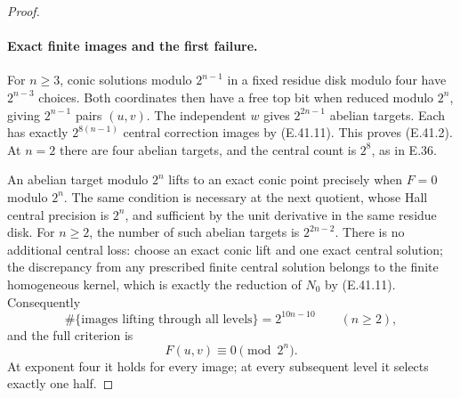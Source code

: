 \begin{proof}
\paragraph{Exact finite images and the first failure.}
For $n\ge3$, conic solutions modulo $2^{n-1}$
in a fixed residue disk modulo four have
$2^{n-3}$ choices.  Both coordinates then
have a free top bit when reduced modulo
$2^n$, giving $2^{n-1}$ pairs $(u,v)$.
The independent $w$ gives $2^{2n-1}$
abelian targets.
Each has exactly $2^{8(n-1)}$ central
correction images by \textup{(E.41.11)}.
This proves \textup{(E.41.2)}.
At $n=2$ there are four abelian targets,
and the central count is $2^8$, as in E.36.

An abelian target modulo $2^n$ lifts to an
exact conic point precisely when
$F=0$ modulo $2^n$.
The same condition is necessary at the
next quotient, whose Hall central precision
is $2^n$, and sufficient by the unit
derivative in the same residue disk.
For $n\ge2$, the number of such abelian
targets is $2^{2n-2}$.
There is no additional central loss:
choose an exact conic lift and one exact
central solution; the discrepancy from
any prescribed finite central solution
belongs to the finite homogeneous kernel,
which is exactly the reduction of $N_0$
by \textup{(E.41.11)}.
Consequently
\[
 \#\{\text{images lifting through all levels}\}
                      =2^{10n-10}\qquad(n\ge2),
 \tag{E.41.21}
\]
and the full criterion is
\[
             F(u,v)\equiv0\pmod{2^n}.
 \tag{E.41.22}
\]
At exponent four it holds for every image;
at every subsequent level it selects
exactly one half.


\end{proof}

